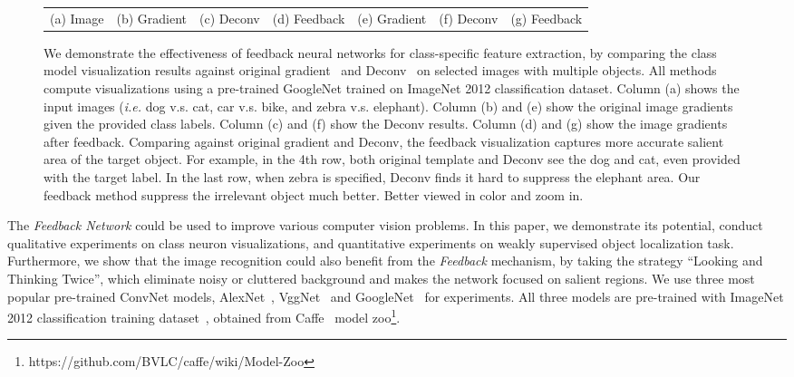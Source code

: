 \begin{figure}
\begin{center}
\begin{tabular}{ccccccc}
{\small (a) Image} &
{\small (b) Gradient} &
{\small (c) Deconv} &
{\small (d) Feedback} &
{\small (e) Gradient} &
{\small (f) Deconv} &
{\small (g) Feedback} \\
\end{tabular}
\caption{We demonstrate the effectiveness of feedback neural networks for class-specific feature extraction, by comparing the class model visualization results against original gradient~\cite{simonyan2013deep} and Deconv~\cite{zeiler2014visualizing} on selected images with multiple objects. All methods compute visualizations using a pre-trained GoogleNet trained on ImageNet 2012 classification dataset. Column (a) shows the input images (\emph{i.e.} dog v.s. cat, car v.s. bike, and zebra v.s. elephant). Column (b) and (e) show the original image gradients given the provided class labels. Column (c) and (f) show the Deconv results. Column (d) and (g) show the image gradients after feedback. Comparing against original gradient and Deconv, the feedback visualization captures more accurate salient area of the target object. For example, in the 4th row, both original template and Deconv see the dog and cat, even provided with the target label. In the last row, when zebra is specified, Deconv finds it hard to suppress the elephant area. Our feedback method suppress the irrelevant object much better. Better viewed in color and zoom in.}
\label{fig:examples}
\end{center}
\end{figure}

The \emph{Feedback Network} could be used to improve various computer vision problems. In this paper, we demonstrate its potential, conduct qualitative experiments on class neuron visualizations, and quantitative experiments on weakly supervised object localization task. Furthermore, we show that the image recognition could also benefit from the \emph{Feedback} mechanism, by taking the strategy ``Looking and Thinking Twice'', which eliminate noisy or cluttered background and makes the network focused on salient regions.
We use three most popular pre-trained ConvNet models, AlexNet~\cite{Krizhevsky2012ImageNet}, VggNet~\cite{simonyan2013deep} and GoogleNet~\cite{Szegedy2014Going} for experiments. All three models are pre-trained with ImageNet 2012 classification training dataset~\cite{deng2009imagenet}, obtained from Caffe~\cite{jia2014caffe} model zoo\footnote{https://github.com/BVLC/caffe/wiki/Model-Zoo}.

